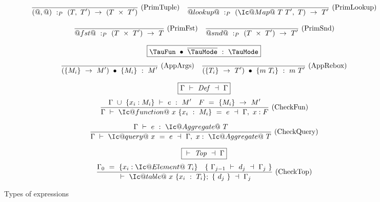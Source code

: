 \begin{figure}
$$
\ruleAx
{
  \TypecheckP{(@,@)}{(T,~T')~\to~(T~\times~T')}
}{PrimTuple}
\ruleAx
{
  \TypecheckP{@lookup@}{(\Ic@Map@~T~T',~T)~\to~T'}
}{PrimLookup}
$$

$$
\enskip \frac {\displaystyle } {\displaystyle 
  @fst@~:_P~(T~\times~T')~\to~T
} \  \mbox{(PrimFst)} \enskip
\enskip \frac {\displaystyle } {\displaystyle 
  @snd@~:_P~(T~\times~T')~\to~T'
} \  \mbox{(PrimSnd)} \enskip
$$



$$
\boxed{\TypecheckApp{\TauFun}{\ov{\TauMode}}{\TauMode}}
$$
$$
\enskip \frac {\displaystyle 
} {\displaystyle 
  (\{M_i\}~\to~M')~\bullet~\{M_i\}~:~M'
} \  \mbox{(AppArgs)} \enskip
\enskip \frac {\displaystyle 
} {\displaystyle 
  (\{T_i\}~\to~T')~\bullet~\{m~T_i\}~:~m~T'
} \  \mbox{(AppRebox)} \enskip
$$


$$
\boxed{\TypecheckS{\Gamma}{\mi{Def}}{\Gamma}}
$$
$$
\ruleIN
{
  \Typecheck{\Gamma~\cup~\{x_i:M_i\}}{e}{M'}
  \quad
  F~=~\{M_i\}~\to~M'
}
{
  \TypecheckS{\Gamma}{\Ic@function@~x~\{x_i~:~M_i\}~=~e}{\Gamma,~x:F}
}{CheckFun}
$$

$$
\ruleIN
{
  \Typecheck{\Gamma}{e}{\Ic@Aggregate@~T}
}
{
  \TypecheckS{\Gamma}{\Ic@query@~x~=~e}{\Gamma,~x:~\Ic@Aggregate@~T}
}{CheckQuery}
$$


$$
\boxed{\TypecheckS{}{\mi{Top}}{\Gamma}}
$$
$$
\ruleIN
{
  \Gamma_0~=~\{x_i:\Ic@Element@~T_i\}
  \quad
  \{~\TypecheckS{\Gamma_{j-1}}{d_j}{\Gamma_j}~\}
}
{
  \TypecheckS
    {}
    {
      \Ic@table@
      ~x~\{x_i~:~T_i\};
      ~\{~d_j~\}
    }
    {\Gamma_j}
}{CheckTop}
$$


\caption{Types of expressions}
\label{icicle:fig:source:type:exp}
\end{figure}

